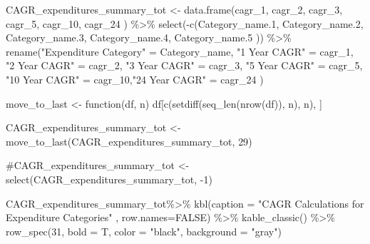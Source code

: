 \documentclass[
  letterpaper,
  DIV=11,
  numbers=noendperiod]{scrreport}
\newenvironment{Shaded}{\begin{snugshade}}{\end{snugshade}}
\newcommand{\AttributeTok}[1]{\textcolor[rgb]{0.40,0.45,0.13}{#1}}
\newcommand{\CommentTok}[1]{\textcolor[rgb]{0.37,0.37,0.37}{#1}}
\newcommand{\ConstantTok}[1]{\textcolor[rgb]{0.56,0.35,0.01}{#1}}
\newcommand{\ControlFlowTok}[1]{\textcolor[rgb]{0.00,0.23,0.31}{#1}}
\newcommand{\DecValTok}[1]{\textcolor[rgb]{0.68,0.00,0.00}{#1}}
\newcommand{\FloatTok}[1]{\textcolor[rgb]{0.68,0.00,0.00}{#1}}
\newcommand{\FunctionTok}[1]{\textcolor[rgb]{0.28,0.35,0.67}{#1}}
\newcommand{\NormalTok}[1]{\textcolor[rgb]{0.00,0.23,0.31}{#1}}
\newcommand{\OtherTok}[1]{\textcolor[rgb]{0.00,0.23,0.31}{#1}}
\newcommand{\SpecialCharTok}[1]{\textcolor[rgb]{0.37,0.37,0.37}{#1}}
\newcommand{\StringTok}[1]{\textcolor[rgb]{0.13,0.47,0.30}{#1}}
\begin{document}
\begin{Shaded}
\begin{Highlighting}[]
\NormalTok{CAGR\_expenditures\_summary\_tot }\OtherTok{\textless{}{-}} \FunctionTok{data.frame}\NormalTok{(cagr\_1, cagr\_2, cagr\_3, cagr\_5, cagr\_10, cagr\_24 ) }\SpecialCharTok{\%\textgreater{}\%} 
  \FunctionTok{select}\NormalTok{(}\SpecialCharTok{{-}}\FunctionTok{c}\NormalTok{(Category\_name}\FloatTok{.1}\NormalTok{, Category\_name}\FloatTok{.2}\NormalTok{, Category\_name}\FloatTok{.3}\NormalTok{, Category\_name}\FloatTok{.4}\NormalTok{, Category\_name}\FloatTok{.5}\NormalTok{ )) }\SpecialCharTok{\%\textgreater{}\%} 
  \FunctionTok{rename}\NormalTok{(}\StringTok{"Expenditure Category"} \OtherTok{=}\NormalTok{ Category\_name, }\StringTok{"1 Year CAGR"} \OtherTok{=}\NormalTok{ cagr\_1, }\StringTok{"2 Year CAGR"} \OtherTok{=}\NormalTok{ cagr\_2, }\StringTok{"3 Year CAGR"} \OtherTok{=}\NormalTok{ cagr\_3, }\StringTok{"5 Year CAGR"} \OtherTok{=}\NormalTok{ cagr\_5, }\StringTok{"10 Year CAGR"} \OtherTok{=}\NormalTok{ cagr\_10,}\StringTok{"24 Year CAGR"} \OtherTok{=}\NormalTok{ cagr\_24 )}

\NormalTok{move\_to\_last }\OtherTok{\textless{}{-}} \ControlFlowTok{function}\NormalTok{(df, n) df[}\FunctionTok{c}\NormalTok{(}\FunctionTok{setdiff}\NormalTok{(}\FunctionTok{seq\_len}\NormalTok{(}\FunctionTok{nrow}\NormalTok{(df)), n), n), ]}

\NormalTok{CAGR\_expenditures\_summary\_tot }\OtherTok{\textless{}{-}} \FunctionTok{move\_to\_last}\NormalTok{(CAGR\_expenditures\_summary\_tot, }\DecValTok{29}\NormalTok{) }

\CommentTok{\#CAGR\_expenditures\_summary\_tot \textless{}{-}   select(CAGR\_expenditures\_summary\_tot, {-}1) }

\NormalTok{CAGR\_expenditures\_summary\_tot}\SpecialCharTok{\%\textgreater{}\%}   
  \FunctionTok{kbl}\NormalTok{(}\AttributeTok{caption =} \StringTok{"CAGR Calculations for Expenditure Categories"}\NormalTok{ , }\AttributeTok{row.names=}\ConstantTok{FALSE}\NormalTok{) }\SpecialCharTok{\%\textgreater{}\%} 
     \FunctionTok{kable\_classic}\NormalTok{() }\SpecialCharTok{\%\textgreater{}\%}
    \FunctionTok{row\_spec}\NormalTok{(}\DecValTok{31}\NormalTok{, }\AttributeTok{bold =}\NormalTok{ T, }\AttributeTok{color =} \StringTok{"black"}\NormalTok{, }\AttributeTok{background =} \StringTok{"gray"}\NormalTok{)}
\end{Highlighting}
\end{Shaded}
\end{document}
